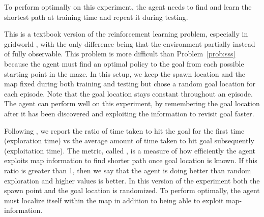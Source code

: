 \begin{description}
  \label{prob:sss}
  To perform optimally on this experiment, the agent needs to find and learn the shortest path at training time and repeat it during testing. 

  This is a textbook version of the reinforcement learning problem, especially in gridworld \cite{SuBaBOOK1998}, with the only difference being that the environment partially instead of fully observable.
  This problem is more difficult than Problem~\ref{prob:sss} because the agent
  must find an optimal policy to the goal from each possible starting point in the maze.
  In this setup, we keep the spawn location and the map fixed during both training and testing but chose a random goal location for each episode.
  Note that the goal location stays constant throughout an episode.
  The agent can perform well on this experiment, by remembering the goal location after it has been discovered and exploiting the information to revisit goal faster.  
  
  Following \cite{MiPaViICLR2017}, we report the ratio
  of time taken to hit the goal for the first time (exploration time) vs the average amount of time taken to hit goal subsequently (exploitation time). The metric, called \emph{\LatencyOneGtOne{}}, is a measure of how efficiently the agent exploits map information to find shorter path once goal location is known. 
  If this ratio is greater than 1, then we say that the agent is doing better than random exploration and higher values is better.
  In this version of the experiment both the spawn point and the goal location is randomized. To perform optimally, the agent must localize itself within the map in addition to being able to exploit map-information.
  

\end{description}
